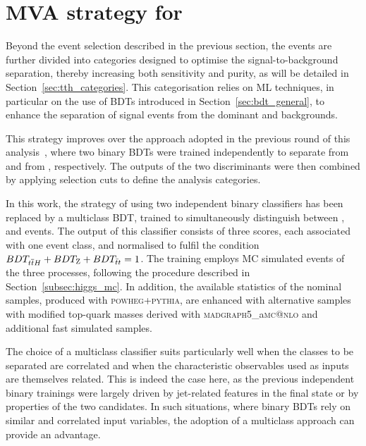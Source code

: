 \section{MVA strategy for \ttHtt}
\label{sec:tth_mva}

Beyond the event selection described in the previous section, the events are further divided into categories designed to optimise the signal-to-background separation, thereby increasing both sensitivity and purity, as will be detailed in Section~\ref{sec:tth_categories}. This categorisation relies on ML techniques, in particular on the use of BDTs introduced in Section~\ref{sec:bdt_general}, to enhance the separation of \ttH signal events from the dominant \ztautau and \ttbar backgrounds.

This strategy improves over the approach adopted in the previous round of this \htautau analysis~\cite{couplings}, where two binary BDTs were trained independently to separate \ttH from \ztautau and \ttH from \ttbar, respectively. The outputs of the two discriminants were then combined by applying selection cuts to define the analysis categories. 

In this work, the strategy of using two independent binary classifiers has been replaced by a multiclass BDT, trained to simultaneously distinguish between \ttH, \ztautau and \ttbar events. The output of this classifier consists of three scores, each associated with one event class, and normalised to fulfil the condition $BDT_{\text{\ensuremath{t\overline{t}H}}} + BDT_{\text{Z}} + BDT_{\text{$\bar{t}t$}} = 1$.
The training employs MC simulated events of the three processes, following the procedure described in Section~\ref{subsec:higgs_mc}. In addition, the available statistics of the nominal \ttbar samples, produced with \textsc{powheg+pythia}, are enhanced with alternative samples with modified top-quark masses derived with \textsc{madgraph5}\_a\textsc{mc@nlo} and additional fast simulated samples.

The choice of a multiclass classifier suits particularly well when the classes to be separated are correlated and when the characteristic observables used as inputs are themselves related. This is indeed the case here, as the previous independent binary trainings were largely driven by jet-related features in the final state or by properties of the two \tauhadvis candidates. In such situations, where binary BDTs rely on similar and correlated input variables, the adoption of a multiclass approach can provide an advantage.

